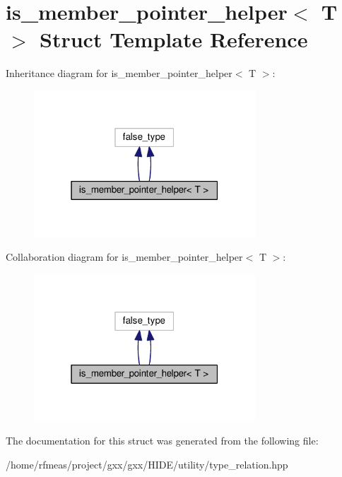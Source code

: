 \hypertarget{structis__member__pointer__helper}{}\section{is\+\_\+member\+\_\+pointer\+\_\+helper$<$ T $>$ Struct Template Reference}
\label{structis__member__pointer__helper}


Inheritance diagram for is\+\_\+member\+\_\+pointer\+\_\+helper$<$ T $>$\+:
\nopagebreak
\begin{figure}[H]
\begin{center}
\leavevmode
\includegraphics[width=235pt]{structis__member__pointer__helper__inherit__graph}
\end{center}
\end{figure}


Collaboration diagram for is\+\_\+member\+\_\+pointer\+\_\+helper$<$ T $>$\+:
\nopagebreak
\begin{figure}[H]
\begin{center}
\leavevmode
\includegraphics[width=235pt]{structis__member__pointer__helper__coll__graph}
\end{center}
\end{figure}


The documentation for this struct was generated from the following file\+:\begin{DoxyCompactItemize}
\item 
/home/rfmeas/project/gxx/gxx/\+H\+I\+D\+E/utility/type\+\_\+relation.\+hpp\end{DoxyCompactItemize}
